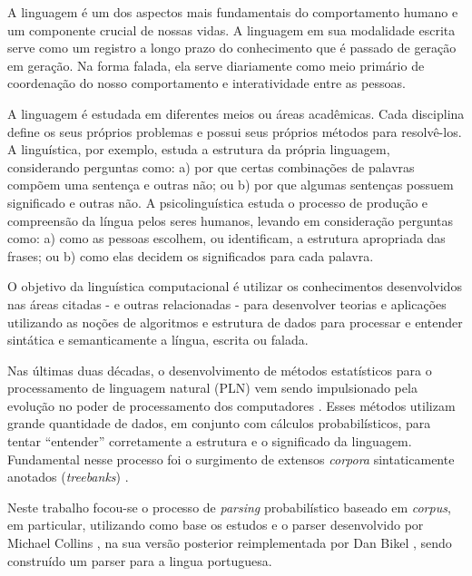A linguagem é um dos aspectos mais fundamentais do comportamento humano e um componente crucial de nossas vidas. A linguagem em sua modalidade escrita serve como um registro a longo prazo do conhecimento que é passado de geração em geração. Na forma falada, ela serve diariamente como meio primário de coordenação do nosso comportamento e interatividade entre as pessoas.

A linguagem  é estudada em diferentes meios ou áreas acadêmicas. Cada disciplina define os seus próprios problemas e possui seus próprios métodos para resolvê-los. A linguística, por exemplo, estuda a estrutura da própria linguagem, considerando perguntas como: a) por que certas combinações de palavras compõem uma sentença e outras não; ou b) por que algumas sentenças possuem significado e outras não. A psicolinguística estuda o processo de produção e compreensão da língua pelos seres humanos, levando em consideração perguntas como: a) como as pessoas escolhem, ou identificam, a estrutura apropriada das frases; ou b) como elas decidem os significados para cada palavra.

O objetivo da linguística computacional é utilizar os conhecimentos desenvolvidos nas áreas citadas - e outras relacionadas - para desenvolver teorias e aplicações utilizando as noções de algoritmos e estrutura de dados para processar e entender sintática e semanticamente a língua, escrita ou falada.

Nas últimas duas décadas, o desenvolvimento de métodos estatísticos para o processamento de linguagem natural (PLN) vem sendo impulsionado pela evolução no poder de processamento dos computadores \cite{manning99, jurafsky}. Esses métodos utilizam grande quantidade de dados, em conjunto com cálculos probabilísticos, para tentar ``entender'' corretamente a estrutura e o significado da linguagem. Fundamental nesse processo foi o surgimento de extensos \emph{corpora} sintaticamente anotados (\emph{treebanks}) \cite{marcus93,marcus94,abeille03,sardinha04}.

Neste trabalho focou-se o processo de \emph{parsing} probabilístico baseado em \emph{corpus}, em particular, utilizando como base os estudos e o parser desenvolvido por Michael Collins \cite{collins99,collins97}, na sua versão posterior reimplementada por Dan Bikel \cite{bikel04}, sendo construído um parser para a lingua portuguesa.



